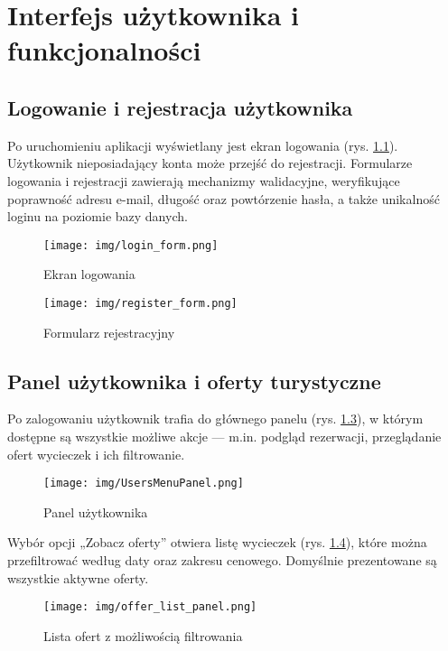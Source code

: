 \chapter{Interfejs użytkownika i funkcjonalności}

\section{Logowanie i rejestracja użytkownika}

Po uruchomieniu aplikacji wyświetlany jest ekran logowania (rys. \ref{fig:login}). Użytkownik nieposiadający konta może przejść do rejestracji. Formularze logowania i rejestracji zawierają mechanizmy walidacyjne, weryfikujące poprawność adresu e-mail, długość oraz powtórzenie hasła, a także unikalność loginu na poziomie bazy danych.

\begin{figure}[H]
    \centering
    \texttt{[image: img/login\_form.png]}
    \caption{Ekran logowania}
    \label{fig:login}
\end{figure}

\begin{figure}[H]
    \centering
    \texttt{[image: img/register\_form.png]}
    \caption{Formularz rejestracyjny}
    \label{fig:register}
\end{figure}

\section{Panel użytkownika i oferty turystyczne}

Po zalogowaniu użytkownik trafia do głównego panelu (rys. \ref{fig:userpanel}), w którym dostępne są wszystkie możliwe akcje — m.in. podgląd rezerwacji, przeglądanie ofert wycieczek i ich filtrowanie.

\begin{figure}[H]
    \centering
    \texttt{[image: img/UsersMenuPanel.png]}
    \caption{Panel użytkownika}
    \label{fig:userpanel}
\end{figure}

Wybór opcji „Zobacz oferty” otwiera listę wycieczek (rys. \ref{fig:offers}), które można przefiltrować według daty oraz zakresu cenowego. Domyślnie prezentowane są wszystkie aktywne oferty.

\begin{figure}[H]
    \centering
    \texttt{[image: img/offer\_list\_panel.png]}
    \caption{Lista ofert z możliwością filtrowania}
    \label{fig:offers}
\end{figure}

